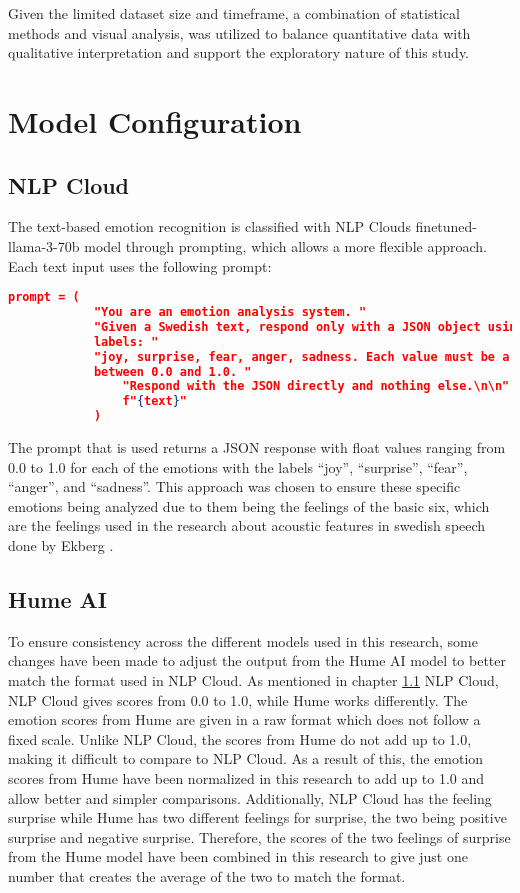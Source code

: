 Given the limited dataset size and timeframe, a combination of statistical methods and visual analysis, was utilized to balance quantitative data with qualitative interpretation and support the exploratory nature of this study. 

\section{Model Configuration}
\subsection{NLP Cloud}
\label{sec:method-nlp}
The text-based emotion recognition is classified with NLP Clouds finetuned-llama-3-70b model
through prompting, which allows a more flexible approach.
Each text input uses the following prompt:
\begin{center}
    \begin{minipage}{0.7\textwidth} 
    \begin{lstlisting}[language=json, caption={NLP Cloud configuration prompt.}]
        prompt = (
            "You are an emotion analysis system. "
            "Given a Swedish text, respond only with a JSON object using these emotion
            labels: "
            "joy, surprise, fear, anger, sadness. Each value must be a float
            between 0.0 and 1.0. "
                "Respond with the JSON directly and nothing else.\n\n"
                f"{text}"
            )
    \end{lstlisting}
    \end{minipage}
\end{center} 
The prompt that is used returns a JSON response with float values ranging from 0.0 to 1.0 for each of
the emotions with the labels “joy”, “surprise”, “fear”, “anger”, and “sadness”. This approach
was chosen to ensure these specific emotions being analyzed due to them being the feelings of the basic
six, which are the feelings used in the research about acoustic features in swedish speech done by
Ekberg \autocite{Ekberg2023}. 

\subsection{Hume AI}
To ensure consistency across the different models used in this research, some changes have been
made to adjust the output from the Hume AI model to better match the format used in NLP Cloud.
As mentioned in chapter \ref{sec:method-nlp} NLP Cloud, NLP Cloud gives scores from 0.0 to 1.0, while Hume
works differently. The emotion scores from Hume are given in a raw format which does not follow a
fixed scale. Unlike NLP Cloud, the scores from Hume do not add up to 1.0, making it difficult to
compare to NLP Cloud. As a result of this, the emotion scores from Hume have been normalized in
this research to add up to 1.0 and allow better and simpler comparisons.
Additionally, NLP Cloud has the feeling surprise while Hume has two different feelings for surprise,
the two being positive surprise and negative surprise. Therefore, the scores of the two feelings of
surprise from the Hume model have been combined in this research to give just one number that
creates the average of the two to match the format.

